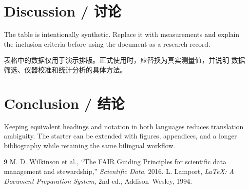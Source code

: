 \documentclass[12pt,a4paper,twoside]{ctexart}
\begin{document}
\section{Discussion / 讨论}
The table is intentionally synthetic. Replace it with measurements and explain
the inclusion criteria before using the document as a research record.

表格中的数据仅用于演示排版。正式使用时，应替换为真实测量值，并说明
数据筛选、仪器校准和统计分析的具体方法。

\section{Conclusion / 结论}
Keeping equivalent headings and notation in both languages reduces translation
ambiguity. The starter can be extended with figures, appendices, and a longer
bibliography while retaining the same bilingual workflow.

\begin{thebibliography}{9}
 M. D. Wilkinson et al., ``The FAIR Guiding Principles for
scientific data management and stewardship,'' \emph{Scientific Data}, 2016.
 L. Lamport, \emph{LaTeX: A Document Preparation System}, 2nd ed.,
Addison--Wesley, 1994.
\end{thebibliography}
\end{document}

